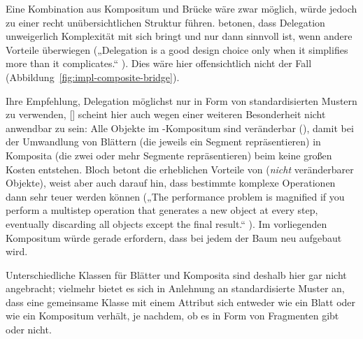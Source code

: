 \documentclass[../main/thesis.tex]{subfiles}
\begin{document}
Eine Kombination aus Kompositum und Brücke wäre zwar möglich, würde jedoch zu einer recht unübersichtlichen Struktur führen.
 betonen, dass Delegation unweigerlich Komplexität mit sich bringt und nur dann sinnvoll ist, wenn andere Vorteile überwiegen („Delegation is a good design choice only when it simplifies more than it complicates.“ ).
Dies wäre hier offensichtlich nicht der Fall (Abbildung~\ref{fig:impl-composite-bridge}).

Ihre Empfehlung, Delegation möglichst nur in Form von standardisierten Mustern zu verwenden, [\cfibid] scheint hier auch wegen einer weiteren Besonderheit nicht anwendbar zu sein:
Alle Objekte im -Kompositum sind veränderbar (), damit bei der Umwandlung von Blättern (die jeweils ein Segment repräsentieren) in Komposita (die zwei oder mehr Segmente repräsentieren) beim  keine großen Kosten entstehen.
Bloch betont die erheblichen Vorteile von  (\emph{nicht} veränderbarer Objekte), weist aber auch darauf hin, dass bestimmte komplexe Operationen dann sehr teuer werden können („The performance problem is magnified if you perform a multistep operation that generates a new object at every step, eventually discarding all objects except the final result.“ ).
Im vorliegenden Kompositum würde  gerade erfordern, dass bei jedem  der Baum neu aufgebaut wird.

Unterschiedliche Klassen für Blätter und Komposita sind deshalb hier gar nicht angebracht; vielmehr bietet es sich in Anlehnung an standardisierte Muster an, dass eine gemeinsame Klasse mit einem Attribut  sich entweder wie ein Blatt oder wie ein Kompositum verhält, je nachdem, ob es  in Form von Fragmenten gibt oder nicht.

\end{document}
